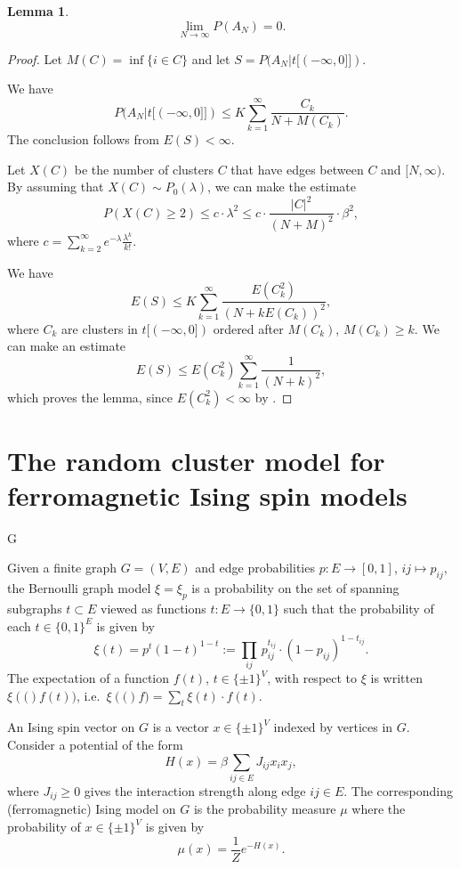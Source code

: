 \documentclass[11pt, a4paper, oneside]{article}
\newtheorem{lem}[thm]{Lemma}
\theoremstyle{definition}
\theoremstyle{remark}
\begin{document}
\begin{lem}
$$\lim_{N\to \infty} P(A_N)=0.$$
\end{lem}

\begin{proof}
  Let $M(C)=\inf \{i\in C \}$ and let $S=P(A_N |t[(-\infty, 0]])$.

  We have
$$P(A_N|t[(-\infty, 0]])\leq K \sum_{k=1}^\infty \frac{C_k}{N+M(C_k)}.$$
The conclusion follows from $E(S)<\infty$.

Let $X(C)$ be the number of clusters $C$ that have edges between $C$ and
$[N,\infty)$. By assuming that $X(C)\sim P_0(\lambda)$, we can make the estimate
$$P(X(C)\geq 2)\leq c\cdot \lambda^2 \leq c\cdot \frac{|C|^2}{(N+M)^2}\cdot \beta^2,$$
where $c=\sum_{k=2}^\infty e^{-\lambda} \frac{\lambda^k}{k!}$.

We have
$$E(S) \leq K \sum_{k=1}^\infty \frac{E(C_k^2)}{(N+k E(C_k))^2},$$
where $C_k$ are clusters in $t[(-\infty, 0])$ ordered after $M(C_k)$,
$M(C_k)\geq k$. We can make an estimate
$$E(S)\leq E(C_k^2)\sum _{k=1}^\infty \frac{1}{(N+k)^2},$$
which proves the lemma, since $E(C_k^2)<\infty$ by \cite{kesten}.

\end{proof}

\section{The random cluster model for ferromagnetic Ising spin models}

\def\SI{\{\pm1\}}
\def\SB{\{0,1\}}
\def\b{b}
G
\def\XI#1{\xi\left(#1\right)}

Given a finite graph $G=(V,E)$ and edge probabilities $p:E\to[0,1]$, $ij\mapsto p_{ij}$, the
Bernoulli graph model $\xi = \xi_p$ is a probability on the set of spanning subgraphs
$t\subset E$ viewed as functions $t:E\to\{0,1\}$ such that the probability of each
$t\in\{0,1\}^E$ is given by
\[ \xi(t) = p^t(1-t)^{1-t} := \prod_{ij}\, p_{ij}^{t_{ij}}\cdot
  (1-p_{ij})^{1-t_{ij}}. \] The expectation of a function $f(t)$, $t\in\SI^V$,
with respect to $\xi$ is written $\XI(f(t))$, i.e.\
\(\XI(f) = \sum_{t} \xi(t)\cdot f(t)\).

An Ising spin vector on $G$ is a vector $x\in\SI^V$ indexed by vertices in $G$.
Consider a potential of the form
\[ H(x) = \beta \sum_{ij\in E} J_{ij} x_i x_j, \] where $J_{ij}\geq 0$ gives the
interaction strength along edge $ij\in E$. The corresponding (ferromagnetic)
Ising model on $G$ is the probability measure $\mu$ where the probability of
$x\in \SI^V$ is given by
\[ \mu(x) = \frac 1{Z} e^{-H(x)}. \]
\end{document}
